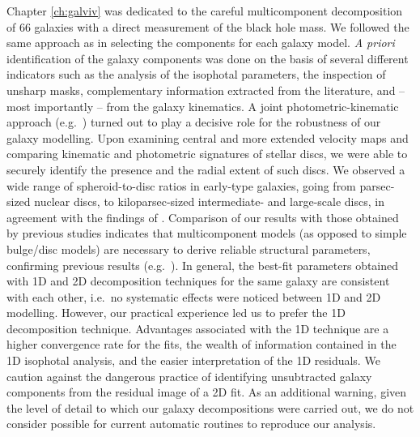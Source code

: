 Chapter \ref{ch:galviv} was dedicated to the careful multicomponent decomposition of 66 galaxies 
with a direct measurement of the black hole mass. 
We followed the same approach as \citet{laurikainen2005} in selecting the components for each galaxy model.  
\emph{A priori} identification of the galaxy components was done on the basis of several different indicators 
such as the analysis of the isophotal parameters, 
the inspection of unsharp masks, 
complementary information extracted from the literature, 
and -- most importantly -- from the galaxy kinematics. 
A joint photometric-kinematic approach (e.g.~\citealt{krajnovic2013,arnold2014}) 
turned out to play a decisive role for the robustness of our galaxy modelling. 
Upon examining central \citep{atlas3dIII,scott2014} and more extended \citep{arnold2014} velocity maps 
and comparing kinematic and photometric signatures of stellar discs, 
we were able to securely identify the presence and the radial extent of such discs. 
We observed a wide range of spheroid-to-disc ratios in early-type galaxies, 
going from parsec-sized nuclear discs, to kiloparsec-sized intermediate- and large-scale discs, 
in agreement with the findings of \citet{krajnovic2013}. 
Comparison of our results with those obtained by previous studies indicates that 
multicomponent models (as opposed to simple bulge/disc models) are necessary 
to derive reliable structural parameters, confirming previous results 
(e.g.~\citealt{laurikainen2005,laurikainen2007,laurikainen2010,lasker2014data,salo2015}). 
In general, the best-fit parameters obtained with 1D and 2D decomposition techniques for the same galaxy 
are consistent with each other, 
i.e.~no systematic effects were noticed between 1D and 2D modelling. 
However, our practical experience led us to prefer the 1D decomposition technique. 
Advantages associated with the 1D technique are a higher convergence rate for the fits, 
the wealth of information contained in the 1D isophotal analysis, 
and the easier interpretation of the 1D residuals. 
We caution against the dangerous practice of identifying unsubtracted galaxy components 
from the residual image of a 2D fit. 
As an additional warning, 
given the level of detail to which our galaxy decompositions were carried out, 
we do not consider possible for current automatic routines to reproduce our analysis. \\

